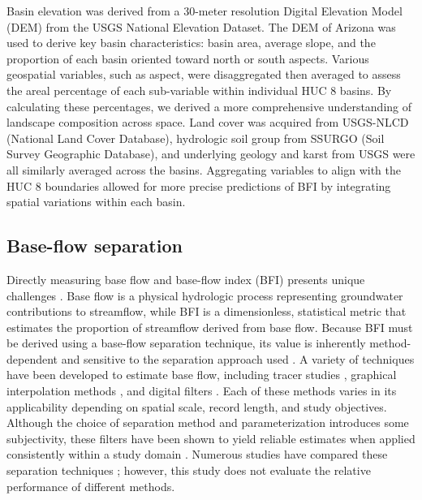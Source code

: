 \documentclass[
  authoryear,
  preprint,
  1p,
  onecolumn]{elsarticle}
\begin{document}
Basin elevation was derived from a 30-meter resolution Digital Elevation
Model (DEM) from the USGS National Elevation Dataset. The DEM of Arizona
was used to derive key basin characteristics: basin area, average slope,
and the proportion of each basin oriented toward north or south aspects.
Various geospatial variables, such as aspect, were disaggregated then
averaged to assess the areal percentage of each sub-variable within
individual HUC 8 basins. By calculating these percentages, we derived a
more comprehensive understanding of landscape composition across space.
Land cover was acquired from USGS-NLCD (National Land Cover Database),
hydrologic soil group from SSURGO (Soil Survey Geographic Database), and
underlying geology and karst from USGS were all similarly averaged
across the basins. Aggregating variables to align with the HUC 8
boundaries allowed for more precise predictions of BFI by integrating
spatial variations within each basin.

\subsection{Base-flow separation}\label{sec-bf_sep}

Directly measuring base flow and base-flow index (BFI) presents unique
challenges \citep{eckhardt2008}. Base flow is a physical hydrologic
process representing groundwater contributions to streamflow, while BFI
is a dimensionless, statistical metric that estimates the proportion of
streamflow derived from base flow. Because BFI must be derived using a
base-flow separation technique, its value is inherently method-dependent
and sensitive to the separation approach used \citep{beck2013}. A
variety of techniques have been developed to estimate base flow,
including tracer studies \citep{gonzales2009}, graphical interpolation
methods \citep{instituteofhydrology1980, sloto1996}, and digital filters
\citep{arnold1995, eckhardt2005, lyne1979, nathan1990}. Each of these
methods varies in its applicability depending on spatial scale, record
length, and study objectives. Although the choice of separation method
and parameterization introduces some subjectivity, these filters have
been shown to yield reliable estimates when applied consistently within
a study domain
\citep{chapman_1999, eckhardt2005, instituteofhydrology1980, ayers2022}.
Numerous studies have compared these separation techniques
\citep[e.g.,][]{eckhardt2005, eckhardt2008, nathan1990}; however, this
study does not evaluate the relative performance of different methods.
\end{document}
